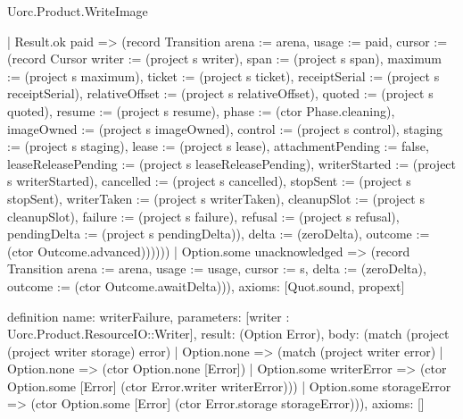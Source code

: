 \begin{lexlean}{Uorc.Product.WriteImage}
\begin{semanticmodule}
{      | Result.ok paid => (record Transition {arena := arena, usage := paid, cursor := (record Cursor {writer := (project s writer), span := (project s span), maximum := (project s maximum), ticket := (project s ticket), receiptSerial := (project s receiptSerial), relativeOffset := (project s relativeOffset), quoted := (project s quoted), resume := (project s resume), phase := (ctor Phase.cleaning), imageOwned := (project s imageOwned), control := (project s control), staging := (project s staging), lease := (project s lease), attachmentPending := false, leaseReleasePending := (project s leaseReleasePending), writerStarted := (project s writerStarted), cancelled := (project s cancelled), stopSent := (project s stopSent), writerTaken := (project s writerTaken), cleanupSlot := (project s cleanupSlot), failure := (project s failure), refusal := (project s refusal), pendingDelta := (project s pendingDelta)}), delta := (zeroDelta), outcome := (ctor Outcome.advanced)})))))
    | Option.some unacknowledged => (record Transition {arena := arena, usage := usage, cursor := s, delta := (zeroDelta), outcome := (ctor Outcome.awaitDelta)})),
  axioms: [Quot.sound, propext]
}

definition{
  name: writerFailure,
  parameters: [writer : Uorc.Product.ResourceIO::Writer],
  result: (Option Error),
  body: (match (project (project writer storage) error)
    | Option.none => (match (project writer error)
      | Option.none => (ctor Option.none [Error])
      | Option.some writerError => (ctor Option.some [Error] (ctor Error.writer writerError)))
    | Option.some storageError => (ctor Option.some [Error] (ctor Error.storage storageError))),
  axioms: []
}


\end{semanticmodule}
\end{lexlean}
